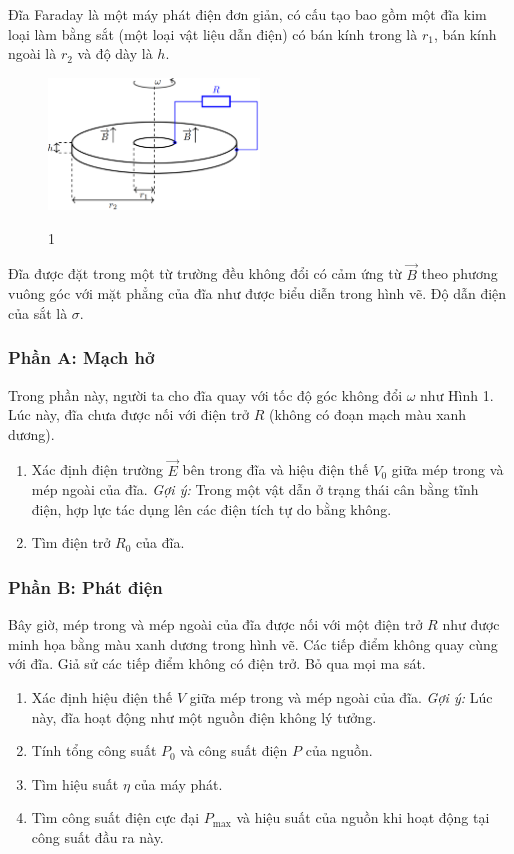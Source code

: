 \noindent Đĩa Faraday là một máy phát điện đơn giản, có cấu tạo bao gồm một đĩa kim loại làm bằng sắt (một loại vật liệu dẫn điện) có bán kính trong là $r_1$, bán kính ngoài là $r_2$ và độ dày là $h$. \\
\begin{figure}[H]
  \centering
  \includegraphics[width=0.5\textwidth]{Figures/Problems/Fig 1.1.png}
  \begin{center}
    \figurename{ 1}
  \end{center}
\end{figure}
\vspace{-0.5cm}
\noindent Đĩa được đặt trong một từ trường đều không đổi có cảm ứng từ $\vec{B}$ theo phương vuông góc với mặt phẳng của đĩa như được biểu diễn trong hình vẽ. Độ dẫn điện của sắt là $\sigma$.

\subsubsection*{Phần A: Mạch hở}
\noindent Trong phần này, người ta cho đĩa quay với tốc độ góc không đổi $\omega$ như Hình 1. Lúc này, đĩa chưa được nối với điện trở $R$ (không có đoạn mạch màu xanh dương).
\begin{enumerate}
  \item Xác định điện trường $\vec{E}$ bên trong đĩa và hiệu điện thế $V_0$ giữa mép trong và mép ngoài của đĩa. \textit{Gợi ý:} Trong một vật dẫn ở trạng thái cân bằng tĩnh điện, hợp lực tác dụng lên các điện tích tự do bằng không.
  \item Tìm điện trở $R_0$ của đĩa.
\end{enumerate}

\subsubsection*{Phần B: Phát điện}
\noindent Bây giờ, mép trong và mép ngoài của đĩa được nối với một điện trở $R$ như được minh họa bằng màu xanh dương trong hình vẽ. Các tiếp điểm không quay cùng với đĩa. Giả sử các tiếp điểm không có điện trở. Bỏ qua mọi ma sát.
\begin{enumerate}
  \item Xác định hiệu điện thế $V$ giữa mép trong và mép ngoài của đĩa. \textit{Gợi ý:} Lúc này, đĩa hoạt động như một nguồn điện không lý tưởng.
  \item Tính tổng công suất $P_0$ và công suất điện $P$ của nguồn.
  \item Tìm hiệu suất $\eta$ của máy phát.
  \item Tìm công suất điện cực đại $P_{\text{max}}$ và hiệu suất của nguồn khi hoạt động tại công suất đầu ra này.
\end{enumerate}

